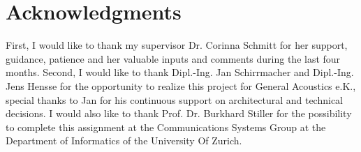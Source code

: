 \chapter*{Acknowledgments}
First, I would like to thank my supervisor Dr. Corinna Schmitt for her support, guidance, patience and her valuable inputs and comments during the last four months. Second, I would like to thank Dipl.-Ing. Jan Schirrmacher and Dipl.-Ing. Jens Hensse for the opportunity to realize this project for General Acoustics e.K., special thanks to Jan for his continuous support on architectural and technical decisions. I would also like to thank Prof. Dr. Burkhard Stiller for the possibility to complete this assignment at the Communications Systems Group at the Department of Informatics of the University Of Zurich.